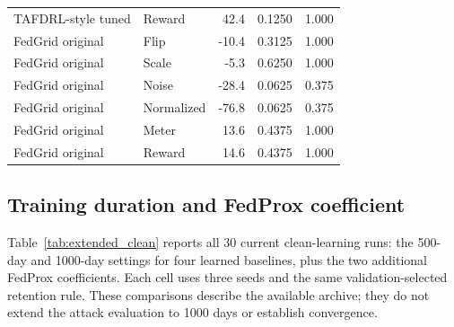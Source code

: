 \documentclass[preprint,12pt,a4paper]{elsarticle}
\begin{document}
\begin{table}[htbp]
\begin{tabular}{llrrr}
TAFDRL-style tuned & Reward & 42.4 & 0.1250 & 1.000 \\
FedGrid original & Flip & -10.4 & 0.3125 & 1.000 \\
FedGrid original & Scale & -5.3 & 0.6250 & 1.000 \\
FedGrid original & Noise & -28.4 & 0.0625 & 0.375 \\
FedGrid original & Normalized & -76.8 & 0.0625 & 0.375 \\
FedGrid original & Meter & 13.6 & 0.4375 & 1.000 \\
FedGrid original & Reward & 14.6 & 0.4375 & 1.000 \\
\bottomrule
\end{tabular}
\end{table}



\subsection{Training duration and FedProx coefficient}
Table~\ref{tab:extended_clean} reports all 30 current clean-learning runs: the 500-day and 1000-day settings for four learned baselines, plus the two additional FedProx coefficients. Each cell uses three seeds and the same validation-selected retention rule. These comparisons describe the available archive; they do not extend the attack evaluation to 1000 days or establish convergence.
\end{document}
